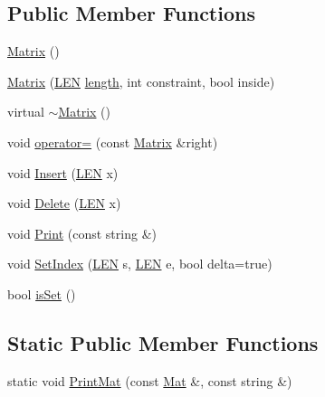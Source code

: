 \subsection*{Public Member Functions}
\begin{DoxyCompactItemize}
\item 
\hyperlink{class_rfold_1_1_matrix_a1e26cf0be8d00482470208b452d24ce8}{Matrix} ()
\item 
\hyperlink{class_rfold_1_1_matrix_a387cfcbc7b6c382d7df38af69e746933}{Matrix} (\hyperlink{energy__const_8hh_a05b49c662c073f89e86804f7856622a0}{L\+E\+N} \hyperlink{class_rfold_1_1_matrix_a4e28e0237e378feced3ce0497b0280d3}{length}, int constraint, bool inside)
\item 
virtual \hyperlink{class_rfold_1_1_matrix_acf7cb76f2cb1cdf031520db04505b4e4}{$\sim$\+Matrix} ()
\item 
void \hyperlink{class_rfold_1_1_matrix_a4cf13f2398aaf383dc62ecd8b59c575d}{operator=} (const \hyperlink{class_rfold_1_1_matrix}{Matrix} \&right)
\item 
void \hyperlink{class_rfold_1_1_matrix_a6b8cd3d50d7349e1ec67927ce06d443f}{Insert} (\hyperlink{energy__const_8hh_a05b49c662c073f89e86804f7856622a0}{L\+E\+N} x)
\item 
void \hyperlink{class_rfold_1_1_matrix_a3a2ac53149bc491c33e695093899cfae}{Delete} (\hyperlink{energy__const_8hh_a05b49c662c073f89e86804f7856622a0}{L\+E\+N} x)
\item 
void \hyperlink{class_rfold_1_1_matrix_aaed1b655000f4a9a2cda435a4df1155d}{Print} (const string \&)
\item 
void \hyperlink{class_rfold_1_1_matrix_a5616231e444e7786fd7d73add86c025e}{Set\+Index} (\hyperlink{energy__const_8hh_a05b49c662c073f89e86804f7856622a0}{L\+E\+N} s, \hyperlink{energy__const_8hh_a05b49c662c073f89e86804f7856622a0}{L\+E\+N} e, bool delta=true)
\item 
bool \hyperlink{class_rfold_1_1_matrix_a351c76b452fc81c326a97b8607196ac7}{is\+Set} ()
\end{DoxyCompactItemize}
\subsection*{Static Public Member Functions}
\begin{DoxyCompactItemize}
\item 
static void \hyperlink{class_rfold_1_1_matrix_a67cabdd52cfcbc1bde59759181f60310}{Print\+Mat} (const \hyperlink{namespace_rfold_a6392dbfbc164230455fdcdb1a0ff53d7}{Mat} \&, const string \&)
\end{DoxyCompactItemize}
